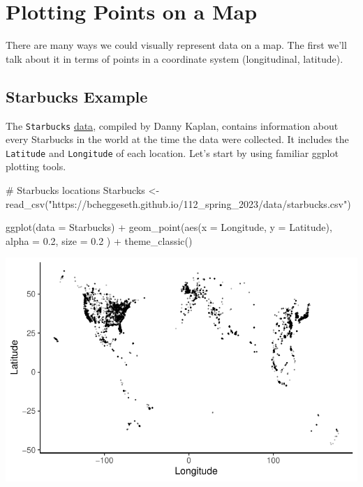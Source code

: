 \documentclass[
  letterpaper,
  DIV=11,
  numbers=noendperiod]{scrreprt}
\newenvironment{Shaded}{\begin{snugshade}}{\end{snugshade}}
\newcommand{\AttributeTok}[1]{\textcolor[rgb]{0.40,0.45,0.13}{#1}}
\newcommand{\CommentTok}[1]{\textcolor[rgb]{0.37,0.37,0.37}{#1}}
\newcommand{\FloatTok}[1]{\textcolor[rgb]{0.68,0.00,0.00}{#1}}
\newcommand{\FunctionTok}[1]{\textcolor[rgb]{0.28,0.35,0.67}{#1}}
\newcommand{\NormalTok}[1]{\textcolor[rgb]{0.00,0.23,0.31}{#1}}
\newcommand{\OtherTok}[1]{\textcolor[rgb]{0.00,0.23,0.31}{#1}}
\newcommand{\SpecialCharTok}[1]{\textcolor[rgb]{0.37,0.37,0.37}{#1}}
\newcommand{\StringTok}[1]{\textcolor[rgb]{0.13,0.47,0.30}{#1}}
\begin{document}
\section*{Plotting Points on a Map}\label{plotting-points-on-a-map}


There are many ways we could visually represent data on a map. The first
we'll talk about it in terms of points in a coordinate system
(longitudinal, latitude).

\subsection*{Starbucks Example}\label{starbucks-example}

The \texttt{Starbucks} \href{data/starbucks.csv}{data}, compiled by
Danny Kaplan, contains information about every Starbucks in the world at
the time the data were collected. It includes the \texttt{Latitude} and
\texttt{Longitude} of each location. Let's start by using familiar
ggplot plotting tools.

\begin{Shaded}
\begin{Highlighting}[]
\CommentTok{\# Starbucks locations}
\NormalTok{Starbucks }\OtherTok{\textless{}{-}} \FunctionTok{read\_csv}\NormalTok{(}\StringTok{"https://bcheggeseth.github.io/112\_spring\_2023/data/starbucks.csv"}\NormalTok{)}
\end{Highlighting}
\end{Shaded}

\begin{Shaded}
\begin{Highlighting}[]
\FunctionTok{ggplot}\NormalTok{(}\AttributeTok{data =}\NormalTok{ Starbucks) }\SpecialCharTok{+}
  \FunctionTok{geom\_point}\NormalTok{(}\FunctionTok{aes}\NormalTok{(}\AttributeTok{x =}\NormalTok{ Longitude, }\AttributeTok{y =}\NormalTok{ Latitude),}
    \AttributeTok{alpha =} \FloatTok{0.2}\NormalTok{,}
    \AttributeTok{size =} \FloatTok{0.2}
\NormalTok{  ) }\SpecialCharTok{+}
  \FunctionTok{theme\_classic}\NormalTok{()}
\end{Highlighting}
\end{Shaded}

\includegraphics{src/06-Spatial_Viz_files/figure-pdf/unnamed-chunk-3-1.pdf}
\end{document}
